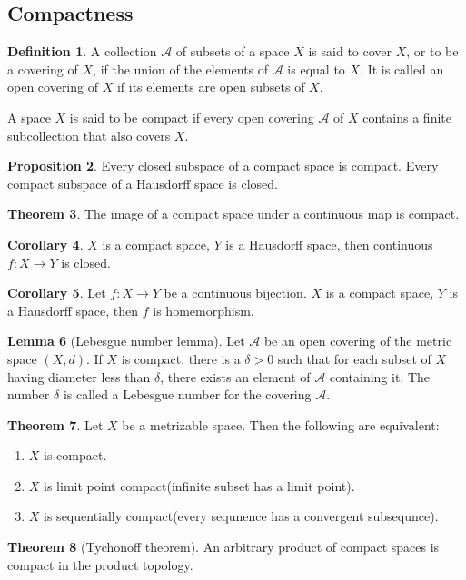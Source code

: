 \documentclass[12pt,a4paper]{book}
\newenvironment{enu}{\begin{enumerate}[(1)]}{\end{enumerate}}
\theoremstyle{definition}
\newtheorem{defn}{Definition}[section]
\newtheorem{coro}[defn]{Corollary}
\newtheorem{theo}[defn]{Theorem}
\newtheorem{lem}[defn]{Lemma}
\newtheorem{prop}[defn]{Proposition}
\begin{document}
\subsection{Compactness}
\begin{defn}
    A collection $\mathcal{A}$ of subsets of a space $X$ is said to cover $X$, or to be a covering of $X$, if the union of the elements of $\mathcal{A}$ is equal to $X$. It is called an open covering of $X$ if its elements are open subsets of $X$.

    A space $X$ is said to be compact if every open covering $\mathcal{A}$ of $X$ contains a finite subcollection that also covers $X$.

\end{defn}
\begin{prop}
    Every closed subspace of a compact space is compact.  Every compact subspace of a Hausdorff space is closed.
\end{prop}
\begin{theo}
    The image of a compact space under a continuous map is compact.
\end{theo}
\begin{coro}
    $X$ is a compact space, $Y$ is a Hausdorff space, then continuous $f:X\rightarrow Y$ is closed.
    \label{proposition: X compact Y T2 imply closed}
\end{coro}
\begin{coro}
    Let $f: X \rightarrow Y$ be a continuous bijection. $X$ is a compact space, $Y$ is a Hausdorff space, then $f$ is homemorphism.
\end{coro}
\begin{lem}[Lebesgue number lemma]
    Let $\mathcal{A}$ be an open covering of the metric space $(X, d)$. If $X$ is compact, there is a $\delta>0$ such that for each subset of $X$ having diameter less than $\delta$, there exists an element of $\mathcal{A}$ containing it.
    The number $\delta$ is called a Lebesgue number for the covering $\mathcal{A}$.
\end{lem}
\begin{theo}
    Let $X$ be a metrizable space. Then the following are equivalent:
    \begin{enu}
        \item  $X$ is compact.
        \item  $X$ is limit point compact(infinite subset has a limit point).
        \item  $X$ is sequentially compact(every sequnence has a convergent subsequnce).
    \end{enu}
\end{theo}
\begin{theo}[Tychonoff theorem]
    An arbitrary product of compact spaces is
    compact in the product topology.
\end{theo}
\end{document}
